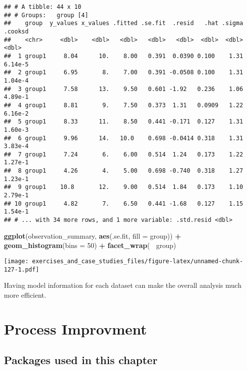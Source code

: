 \documentclass[]{book}
\newenvironment{Shaded}{\begin{snugshade}}{\end{snugshade}}
\newcommand{\DataTypeTok}[1]{\textcolor[rgb]{0.13,0.29,0.53}{#1}}
\newcommand{\DecValTok}[1]{\textcolor[rgb]{0.00,0.00,0.81}{#1}}
\newcommand{\KeywordTok}[1]{\textcolor[rgb]{0.13,0.29,0.53}{\textbf{#1}}}
\newcommand{\NormalTok}[1]{#1}
\newcommand{\OperatorTok}[1]{\textcolor[rgb]{0.81,0.36,0.00}{\textbf{#1}}}
\newcommand{\StringTok}[1]{\textcolor[rgb]{0.31,0.60,0.02}{#1}}
\theoremstyle{definition}
\theoremstyle{definition}
\theoremstyle{definition}
\theoremstyle{remark}
\begin{document}
\begin{verbatim}
## # A tibble: 44 x 10
## # Groups:   group [4]
##    group  y_values x_values .fitted .se.fit  .resid   .hat .sigma  .cooksd
##    <chr>     <dbl>    <dbl>   <dbl>   <dbl>   <dbl>  <dbl>  <dbl>    <dbl>
##  1 group1     8.04      10.    8.00   0.391  0.0390 0.100    1.31  6.14e-5
##  2 group1     6.95       8.    7.00   0.391 -0.0508 0.100    1.31  1.04e-4
##  3 group1     7.58      13.    9.50   0.601 -1.92   0.236    1.06  4.89e-1
##  4 group1     8.81       9.    7.50   0.373  1.31   0.0909   1.22  6.16e-2
##  5 group1     8.33      11.    8.50   0.441 -0.171  0.127    1.31  1.60e-3
##  6 group1     9.96      14.   10.0    0.698 -0.0414 0.318    1.31  3.83e-4
##  7 group1     7.24       6.    6.00   0.514  1.24   0.173    1.22  1.27e-1
##  8 group1     4.26       4.    5.00   0.698 -0.740  0.318    1.27  1.23e-1
##  9 group1    10.8       12.    9.00   0.514  1.84   0.173    1.10  2.79e-1
## 10 group1     4.82       7.    6.50   0.441 -1.68   0.127    1.15  1.54e-1
## # ... with 34 more rows, and 1 more variable: .std.resid <dbl>
\end{verbatim}

\begin{Shaded}
\begin{Highlighting}[]
\KeywordTok{ggplot}\NormalTok{(observation_summary, }\KeywordTok{aes}\NormalTok{(.se.fit, }\DataTypeTok{fill =}\NormalTok{ group)) }\OperatorTok{+}
\StringTok{  }\KeywordTok{geom_histogram}\NormalTok{(}\DataTypeTok{bins =} \DecValTok{50}\NormalTok{) }\OperatorTok{+}
\StringTok{  }\KeywordTok{facet_wrap}\NormalTok{(}\OperatorTok{~}\StringTok{ }\NormalTok{group)}
\end{Highlighting}
\end{Shaded}

\texttt{[image: exercises\_and\_case\_studies\_files/figure-latex/unnamed-chunk-127-1.pdf]}

Having model information for each dataset can make the overall analysis
much more efficient.

\hypertarget{process-improvment}{%
\chapter{Process Improvment}\label{process-improvment}}

\hypertarget{packages-used-in-this-chapter-2}{%
\section{Packages used in this
chapter}\label{packages-used-in-this-chapter-2}}
\end{document}
